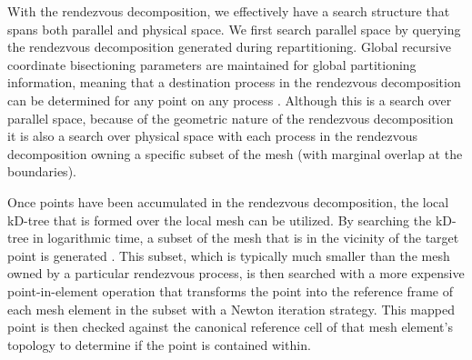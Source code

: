 \documentclass{mc2013}
\begin{document}
With the rendezvous decomposition, we effectively have a search
structure that spans both parallel and physical space. We first search
parallel space by querying the rendezvous decomposition generated
during repartitioning. Global recursive coordinate bisectioning
parameters are maintained for global partitioning information, meaning
that a destination process in the rendezvous decomposition can be
determined for any point on any process \cite{Berger_1987}. Although
this is a search over parallel space, because of the geometric nature
of the rendezvous decomposition it is also a search over physical
space with each process in the rendezvous decomposition owning a
specific subset of the mesh (with marginal overlap at the boundaries).
 
Once points have been accumulated in the rendezvous decomposition, the
local kD-tree that is formed over the local mesh can be utilized. By
searching the kD-tree in logarithmic time, a subset of the mesh that
is in the vicinity of the target point is generated
\cite{Bentley_1975}. This subset, which is typically much smaller than
the mesh owned by a particular rendezvous process, is then searched
with a more expensive point-in-element operation that transforms the
point into the reference frame of each mesh element in the subset with
a Newton iteration strategy. This mapped point is then checked against
the canonical reference cell of that mesh element's topology to
determine if the point is contained within.

\end{document}
